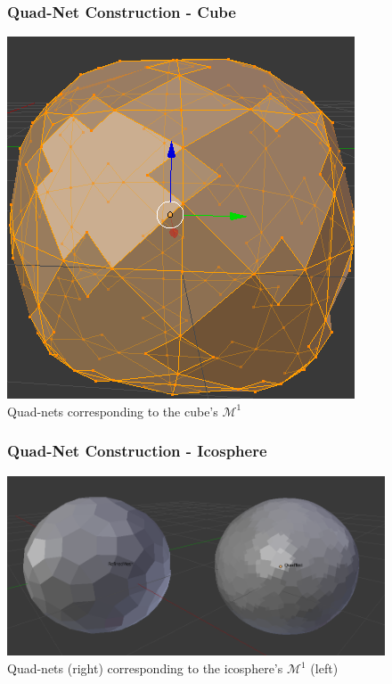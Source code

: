 \documentclass[11pt]{beamer}
\begin{document}
	\begin{frame}
		\begin{figure}[h]
			\frametitle{Quad-Net Construction - Cube}
			\centering
			\includegraphics[width=.55\linewidth]{img/quad_cube_2}
			\caption{Quad-nets corresponding to the cube's $\mathcal{M}^1$ }	
		\end{figure}
	\end{frame}

	\begin{frame}
		\begin{figure}[h]
			\frametitle{Quad-Net Construction - Icosphere}
			\centering
			\includegraphics[width=.8\linewidth]{img/quad_icosphere}
			\caption{Quad-nets (right) corresponding to the icosphere's $\mathcal{M}^1$ (left)}	
		\end{figure}
	\end{frame}
	
\end{document}
